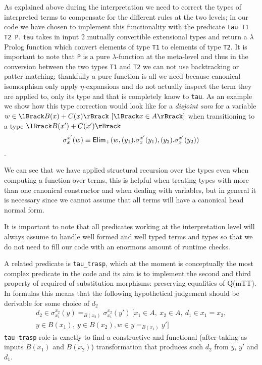 	As explained above during the interpretation we need to correct the types of interpreted terms to compensate for the different rules at the two levels; in our code we have chosen to implement this functionality with the predicate \verb|tau T1 T2 P|. \verb|tau| takes in input 2 mutually convertible extensional types and return a $\lambda$Prolog function which convert elements of type \verb|T1| to elements of type \verb|T2|. It is important to note that \verb|P| is a pure $\lambda$-function at the meta-level and thus in the conversion between the two types \verb|T1| and \verb|T2| we can not use backtracking or patter matching; thankfully a pure function is all we need because canonical isomorphism only apply $\eta$-expansions and do not actually inspect the term they are applied to, only its type and that is completely know to \verb|tau|. As an example we show how this type correction would look like for a \emph{disjoint sum} for a variable $w \in \trad{B(x)+C(x)} \ [\trad{x \in A}]$ when transitioning to a type $\trad{B(x')+C(x')}$  \[\sigma_{x}^{x'}(w) \equiv {\text{\ensuremath{\mathsf{Elim}}}}_+(w, (y_1).\sigma_{x}^{x'}(y_1), (y_2).\sigma_{x}^{x'}(y_2))\].
	 
	We can see that we have applied structural recursion over the types even when computing a function over terms, this is helpful when treating types with more than one canonical constructor and  when dealing with variables, but in general it is necessary since we cannot assume that all terms will have a canonical head normal form.

	It is important to note that all predicates working at the interpretation level will always assume to handle well formed and well typed terms and types so that we do not need to fill our code with an enormous amount of runtime checks.
		
	A related predicate is \verb|tau_trasp|, which at the moment is conceptually the most complex predicate in the code and its aim is to implement the second and third property of required of substitution morphisms: preserving equalities of Q(mTT). In formulas this means that the following hypothetical judgement should be derivable for some choice of $d_2$ 
	\begin{multline}
	d_2 \in \sigma_{x_1}^{x_2}(y) =_{B(x_2)} \sigma_{x_1}^{x_2}(y') \ [x_1 \in A,\ x_2 \in A,\ d_1 \in x_1 = x_2,\\ y\in B(x_1),\ y\in B(x_2), w\in y =_{B(x_1)} y']\end{multline}
	\verb|tau_trasp| role is exactly to find a constructive and functional (after taking as inputs $B(x_1)$ and $B(x_2)$) transformation that produces such $d_2$ from $y$, $y'$ and $d_1$.
	
